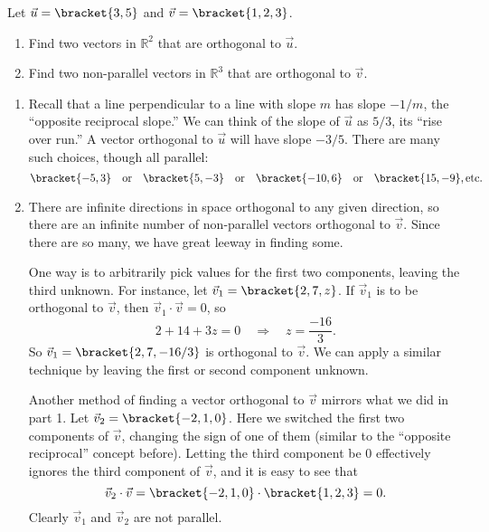 \begin{example}\label{ex_dotp8}
Let $\vec u = \bracket{3,5}$ and $\vec v = \bracket{1,2,3}$. 
\begin{enumerate}
	\item Find two vectors in $\mathbb{R}^2$ that are orthogonal to $\vec u$.
	\item	Find two non-parallel vectors in $\mathbb{R}^3$ that are orthogonal to $\vec v$.
\end{enumerate}
\solution
\begin{enumerate}
	\item Recall that a line perpendicular to a line with slope $m$ has slope $-1/m$, the ``opposite reciprocal slope.'' We can think of the slope of $\vec u$ as $5/3$, its ``rise over run.'' A vector orthogonal to $\vec u$ will have slope $-3/5$. There are many such choices, though all parallel:
	\[\bracket{-5,3}\quad \text{or} \quad\bracket{5,-3}\quad \text{or} \quad \bracket{-10,6}\quad \text{or} \quad \bracket{15,-9},\text{etc.}\]
	\item		There are infinite directions in space orthogonal to any given direction, so there are an infinite number of non-parallel vectors orthogonal to $\vec v$. Since there are so many, we have great leeway in finding some.
	
	One way is to arbitrarily pick values for the first two components, leaving the third unknown. For instance, let $\vec v_1 = \bracket{2,7,z}$. If $\vec v_1$ is to be orthogonal to $\vec v$, then $\vec v_1\cdot\vec v = 0$, so 
	\[2+14+3z=0 \quad \Rightarrow \quad z = \frac{-16}{3}.\]
	So $\vec v_1 = \bracket{2, 7, -16/3}$ is orthogonal to $\vec v$. We can apply a similar technique by leaving the first or second component unknown.
	
	Another method of finding a vector orthogonal to $\vec v$ mirrors what we did in part 1. Let $\vec v_2 = \bracket{-2,1,0}$. Here we switched the first two components of $\vec v$, changing the sign of one of them (similar to the ``opposite reciprocal'' concept before). Letting the third component be 0 effectively ignores the third component of $\vec v$, and it is easy to see that 
	\[\vec v_2\cdot\vec v = \bracket{-2,1,0}\cdot\bracket{1,2,3}= 0.\]
	Clearly $\vec v_1$ and $\vec v_2$ are not parallel.
\end{enumerate}
\end{example}

